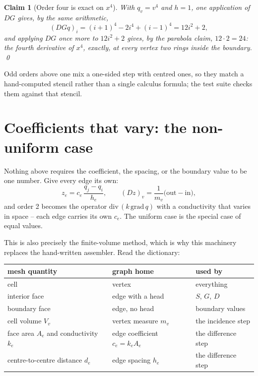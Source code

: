 \documentclass[11pt]{article}
\newtheorem{claim}{Claim}
\begin{document}
\begin{claim}[Order four is exact on $x^4$]
With $q_v = v^4$ and $h = 1$, one application of $DG$ gives, by the
same arithmetic,
\[
(DGq)_i = (i+1)^4 - 2i^4 + (i-1)^4 = 12 i^2 + 2 ,
\]
and applying $DG$ once more to $12 i^2 + 2$ gives, by the parabola
claim, $12 \cdot 2 = 24$: the fourth derivative of $x^4$, exactly, at
every vertex two rings inside the boundary. \qed
\end{claim}

Odd orders above one mix a one-sided step with centred ones, so they
match a hand-computed stencil rather than a single calculus formula;
the test suite checks them against that stencil.

\section{Coefficients that vary: the non-uniform case}
\label{sec:weights}

Nothing above requires the coefficient, the spacing, or the boundary
value to be one number. Give every edge its own:
\[
z_e = c_e\,\frac{q_j - q_i}{h_e},
\qquad
(Dz)_v = \frac{1}{m_v}\bigl(\text{out} - \text{in}\bigr),
\]
and order 2 becomes the operator
$\mathrm{div}\,(k\,\mathrm{grad}\,q)$ with a conductivity that varies
in space -- each edge carries its own $c_e$. The uniform case is the
special case of equal values.

This is also precisely the finite-volume method, which is why this
machinery replaces the hand-written assembler. Read the dictionary:

\medskip
\begin{center}
\begin{tabular}{@{}lll@{}}
\toprule
mesh quantity & graph home & used by \\
\midrule
cell               & vertex            & everything \\
interior face      & edge with a head  & $S$, $G$, $D$ \\
boundary face      & edge, no head     & boundary values \\
cell volume $V_v$  & vertex measure $m_v$ & the incidence step \\
face area $A_e$ and conductivity $k_e$
                   & edge coefficient $c_e = k_e A_e$ & the difference step \\
centre-to-centre distance $d_e$
                   & edge spacing $h_e$ & the difference step \\
\bottomrule
\end{tabular}
\end{center}
\medskip
\end{document}
